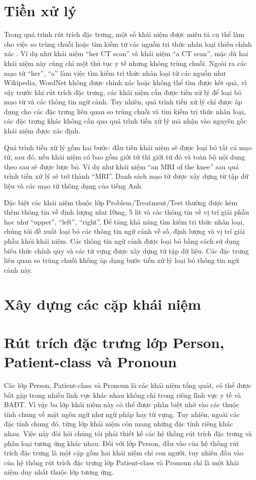 \section{Tiền xử lý}
Trong quá trình rút trích đặc trưng, một số khái niệm được miêu tả cụ thể làm cho việc so trùng chuỗi hoặc tìm kiếm từ các nguồn tri thức nhân loại thiếu chính xác \cite{YanXu2012}. Ví dụ như khái niệm ``her CT scan'' và khái niệm ``a CT scan'', mặc dù hai khái niệm này cùng chỉ một thủ tục y tế nhưng không trùng chuỗi. Ngoài ra các mạo từ ``her'', ``a'' làm việc tìm kiếm tri thức nhân loại từ các nguồn như Wikipedia, WordNet không được chính xác hoặc không thể tìm được kết quả, vì vậy trước khi rút trích đặc trưng, các khái niệm cần được tiền xử lý để loại bỏ mạo từ và các thông tin ngữ cảnh. Tuy nhiên, quá trình tiền xử lý chỉ được áp dụng cho các đặc trưng liên quan so trùng chuỗi và tìm kiếm tri thức nhân loại, các đặc trưng khác không cần qua quá trình tiền xử lý mà nhận vào nguyên gốc khái niệm được xác định.

Quá trình tiền xử lý gồm hai bước: đầu tiên khái niệm sẽ được loại bỏ tất cả mạo từ, sau đó, nếu khái niệm có bao gồm giới từ thì giới từ đó và toàn bộ nội dung theo sau sẽ được lược bỏ. Ví dụ như khái niệm “an MRI of the knee” sau quá trình tiền xử lý sẽ trở thành “MRI”. Danh sách mạo từ được xây dựng từ tập dữ liệu và các mạo từ thông dụng của tiếng Anh.

Đặc biệt các khái niệm thuộc lớp Problem/Treatment/Test thường được kèm thêm thông tin về định lượng như 10mg, 5 lit và các thông tin về vị trí giải phẫu học như ``upper'', ``left'', ``right''. Để tăng khả năng tìm kiếm tri thức nhân loại, chúng tôi đề xuất loại bỏ các thông tin ngữ cảnh về số, định lượng và vị trí giải phẫu khỏi khái niệm. Các thông tin ngữ cảnh được loại bỏ bằng cách sử dụng biểu thức chính quy và các từ vựng được xây dựng từ tập dữ liệu. Các đặc trưng liên quan so trùng chuỗi không áp dụng bước tiền xử lý loại bỏ thông tin ngữ cảnh này.

\section{Xây dựng các cặp khái niệm}

\section{Rút trích đặc trưng lớp Person, Patient-class và Pronoun}
Các lớp Person, Patient-class và Pronoun là các khái niệm tổng quát, có thể được bắt gặp trong nhiều lĩnh vực khác nhau không chỉ trong riêng lĩnh vực y tế và BAĐT. Vì vậy ba lớp khái niệm này có thể được phân biệt nhờ vào các thuộc tính chung về mặt ngôn ngữ như ngữ pháp hay từ vựng. Tuy nhiên, ngoài các đặc tính chung đó, từng lớp khái niệm còn mang những đặc tính riêng khác nhau. Việc này đòi hỏi chúng tôi phải thiết kế các hệ thống rút trích đặc trưng và phân loại tương ứng khác nhau. Đối với lớp Person, đầu vào của hệ thống rút trích đặc trưng là một cặp gồm hai khái niệm chỉ con người, tuy nhiên đầu vào của hệ thống rút trích đặc trưng lớp Patient-class và Pronoun chỉ là một khái niệm duy nhất thuộc lớp tương ứng.

